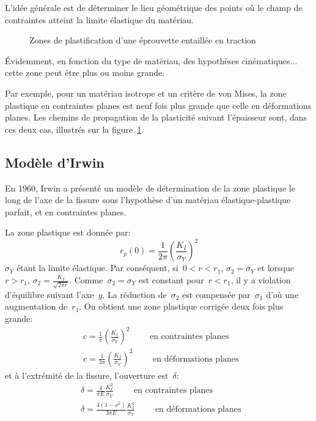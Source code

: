 L'idée générale est de déterminer le lieu géométrique des points où le
champ de contraintes atteint la limite élastique du matériau.
\begin{figure}[ht]\centering
{}\hspace{9em}
\caption{Zones de plastification d'une éprouvette entaillée en traction}\label{fig:propagation}
\end{figure}
Évidemment, en fonction du type de matériau, des hypothèses cinématiques...
cette zone peut être plus ou moins grande.

\medskip
Par exemple, pour un matériau isotrope et un critère de von Mises, la zone plastique en
contraintes planes est neuf fois plus grande que celle en déformations planes.
\medskipvm
Les chemins de propagation de la plasticité suivant l'épaisseur sont, dans ces deux cas,
illustrés sur la figure~\ref{fig:propagation}.


\medskip
\subsection{Modèle d'Irwin}
En 1960, Irwin a présenté un modèle
de détermination de la zone plastique le long de l'axe de la fissure sous l'hypothèse d'un matériau
élastique-plastique parfait, et en contraintes planes.

La zone plastique est donnée par:
\begin{equation}r_p(0)=\frac1{2\pi}\left(\frac{K_I}{\sigma_Y}\right)^2
\end{equation}$\sigma_Y$ étant la limite élastique.
Par conséquent, si~$0<r<r_1$, $\sigma_2=\sigma_Y$ et lorsque~$r>r_1$, $\sigma_2=\frac{K_I}{\sqrt{2\pi r}}$.
Comme~$\sigma_2=\sigma_Y$ est constant pour~$r < r_1$, il y a violation d'équilibre suivant l'axe~$y$.
La réduction de~$\sigma_2$ est compensée par~$\sigma_1$ d'où une augmentation de~$r_1$.
On obtient une zone plastique corrigée deux fois plus grande:
\begin{align}
&c = \frac1\pi\left(\frac{K_I}{\sigma_Y}\right)^2 \qquad \text{ en contraintes planes }\\
&c = \frac1{3\pi}\left(\frac{K_I}{\sigma_Y}\right)^2 \qquad \text{ en déformations planes }
\end{align}
et à l'extrémité de la fissure, l'ouverture est~$\delta$:
\begin{align}
&\delta = \frac4{\pi E}\frac{K_I^2}{\sigma_Y} \qquad \text{ en contraintes planes }\\
&\delta = \frac{4(1-\nu^2)}{3\pi E}\frac{K_I^2}{\sigma_Y} \qquad \text{ en déformations planes }
\end{align}

